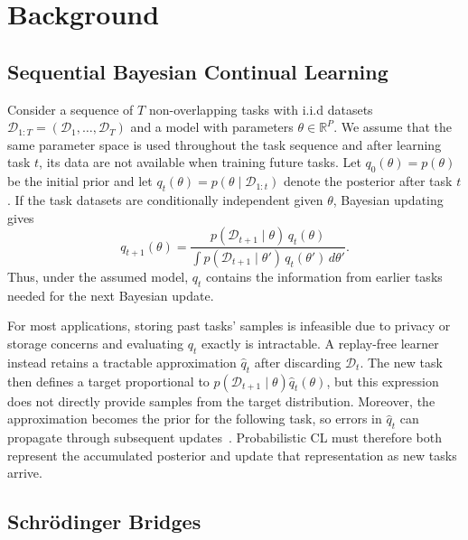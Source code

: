 \section{Background}

\subsection{Sequential Bayesian Continual Learning}

Consider a sequence of $T$ non-overlapping tasks with i.i.d datasets $\mathcal{D}_{1:T}=(\mathcal{D}_1,\ldots,\mathcal{D}_T)$ and a model with parameters $\theta\in\mathbb{R}^P$. We assume that the same parameter space is used throughout the task sequence and after learning task $t$, its data are not available when training future tasks. Let $q_0(\theta)=p(\theta)$ be the initial prior and let $q_t(\theta) = p(\theta\mid\mathcal{D}_{1:t})$ denote the posterior after task $t$. If the task datasets are conditionally independent given $\theta$, Bayesian updating gives
\begin{equation}
    q_{t+1}(\theta)
    = \frac{p(\mathcal{D}_{t+1}\mid\theta)\,q_t(\theta)}
           {\int p(\mathcal{D}_{t+1}\mid\theta')\,q_t(\theta')\,d\theta'}.
    \label{eq:sequential_bayes}
\end{equation}
Thus, under the assumed model, $q_t$ contains the information from earlier tasks needed for the next Bayesian update.

For most applications, storing past tasks' samples is infeasible due to privacy or storage concerns and evaluating $q_t$ exactly is intractable. A replay-free learner instead retains a tractable approximation $\hat q_t$ after discarding $\mathcal{D}_t$. The new task then defines a target proportional to $p(\mathcal{D}_{t+1}\mid\theta)\hat q_t(\theta)$, but this expression does not directly provide samples from the target distribution. Moreover, the
approximation becomes the prior for the following task, so errors in $\hat q_t$ can propagate through subsequent updates~\cite{kessler2023sequential}. Probabilistic CL must therefore both represent the accumulated posterior and update that representation as new tasks arrive.

\subsection{Schr\"odinger Bridges}

